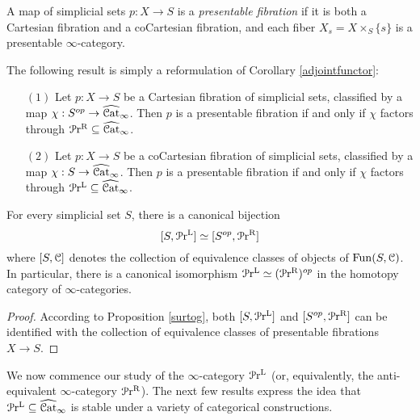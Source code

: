 \begin{definition}\label{urtus}
A map of simplicial sets $p: X \rightarrow S$ is a {\it presentable fibration}
if it is both a Cartesian fibration and a coCartesian fibration, and each fiber
$X_{s} = X \times_{S} \{s\}$ is a presentable $\infty$-category.
\end{definition}

The following result is simply a reformulation of Corollary \ref{adjointfunctor}:

\begin{proposition}\label{surtog}
\begin{itemize}
\item[$(1)$] Let $p: X \rightarrow S$ be a Cartesian fibration of simplicial sets, classified
by a map $\chi: S^{op} \rightarrow \widehat{\operatorname{\mathcal{C}at}}_{\infty}$. Then $p$ is a presentable fibration if and only if $\chi$ factors through $\operatorname{\mathcal{P}r^{R}} \subseteq \widehat{\operatorname{\mathcal{C}at}}_{\infty}$. 

\item[$(2)$] Let $p: X \rightarrow S$ be a coCartesian fibration of simplicial sets, classified by a map $\chi: S \rightarrow \widehat{\operatorname{\mathcal{C}at}}_{\infty}$. Then $p$ is a presentable fibration if and only if
$\chi$ factors through $\operatorname{\mathcal{P}r^{L}} \subseteq \widehat{\operatorname{\mathcal{C}at}}_{\infty}$.

\end{itemize}
\end{proposition}

\begin{corollary}\label{warhog}
For every simplicial set $S$, there is a canonical bijection
$$ [ S, \operatorname{\mathcal{P}r^{L}} ] \simeq [ S^{op}, \operatorname{\mathcal{P}r^{R}} ]$$
where $[S, \operatorname{\mathcal{C}}]$ denotes the collection of equivalence classes of objects of $\operatorname{Fun}(S,\operatorname{\mathcal{C}})$.
In particular, there is a canonical isomorphism $\operatorname{\mathcal{P}r^{L}} \simeq ( \operatorname{\mathcal{P}r^{R}} )^{op}$ in the homotopy category of $\infty$-categories.
\end{corollary}

\begin{proof}
According to Proposition \ref{surtog}, both $[S, \operatorname{\mathcal{P}r^{L}}]$ and $[S^{op}, \operatorname{\mathcal{P}r^{R}}]$ can be identified with the collection of equivalence classes of presentable fibrations $X \rightarrow S$.
\end{proof}

We now commence our study of the $\infty$-category $\operatorname{\mathcal{P}r^{L}}$ (or, equivalently, the anti-equivalent $\infty$-category $\operatorname{\mathcal{P}r^{R}}$). The next few results express the idea that $\operatorname{\mathcal{P}r^{L}} \subseteq \widehat{\operatorname{\mathcal{C}at}}_{\infty}$ is stable under a variety of categorical constructions.

